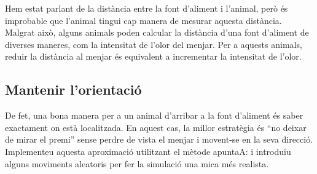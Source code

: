 
Hem estat parlant de la distància entre la font d'aliment i l'animal, però és improbable que l'animal tingui cap manera de mesurar aquesta distància. Malgrat això, alguns animals poden calcular la distància d'una font d'aliment de diverses maneres, com la intensitat de l'olor del menjar. Per a aquests animals, reduir la distància al menjar és equivalent a incrementar la intensitat de l'olor.

\subsection{Mantenir l'orientació}

De fet, una bona manera per a un animal d'arribar a la font d'aliment és saber exactament on està localitzada. En aquest cas, la millor estratègia és ``no deixar de mirar el premi'' sense perdre de vista el menjar i movent-se en la seva direcció. Implementeu aquesta aproximació utilitzant el mètode \textsf{apuntaA:} i introduïu alguns moviments aleatoris per fer la simulació una mica més realista.

